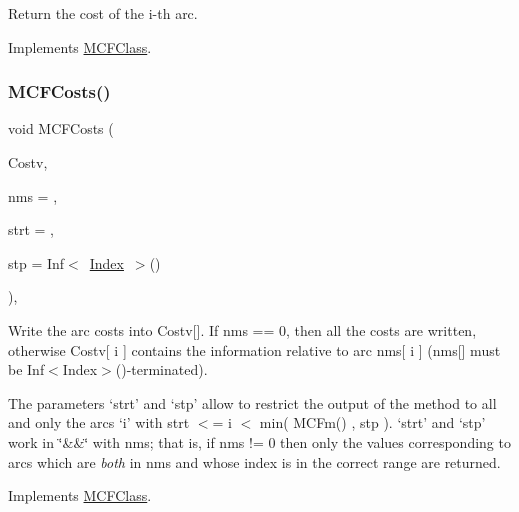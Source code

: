 Return the cost of the i-\/th arc. 

Implements \mbox{\hyperlink{class_m_c_f_class_ac666df7c1e7ed07c0f7574ec307c9e82}{M\+C\+F\+Class}}.

\mbox{\label{class_s_p_tree_a2fed5c60a9bf5b3988eed33d46d0c6de}} 
\subsubsection{\texorpdfstring{M\+C\+F\+Costs()}{MCFCosts()}}
{\footnotesize\ttfamily void M\+C\+F\+Costs (\begin{DoxyParamCaption}\item[{\mbox{\hyperlink{class_m_c_f_class_a62409402be4e4b301e1a568f99f877be}{C\+Row}}}]{Costv,  }\item[{\mbox{\hyperlink{class_m_c_f_class_a81575b2d4e4d5636b17170432150ae69}{c\+Index\+\_\+\+Set}}}]{nms = {},  }\item[{\mbox{\hyperlink{class_m_c_f_class_a76aaabb20535c51a2752b93f6c38fe54}{c\+Index}}}]{strt = {},  }\item[{\mbox{\hyperlink{class_m_c_f_class_ad53d6229d7ec28555a9c9c2fd9abf773}{Index}}}]{stp = {\ttfamily Inf$<$~\mbox{\hyperlink{class_m_c_f_class_ad53d6229d7ec28555a9c9c2fd9abf773}{Index}}~$>$()} }\end{DoxyParamCaption})\hspace{0.3cm}{\ttfamily [override]}, {\ttfamily [virtual]}}

Write the arc costs into Costv\mbox{[}\mbox{]}. If nms == 0, then all the costs are written, otherwise Costv\mbox{[} i \mbox{]} contains the information relative to arc nms\mbox{[} i \mbox{]} (nms\mbox{[}\mbox{]} must be Inf$<$\+Index$>$()-\/terminated).

The parameters `strt' and `stp' allow to restrict the output of the method to all and only the arcs `i' with strt $<$= i $<$ min( M\+C\+Fm() , stp ). `strt' and `stp' work in \char`\"{}\&\&\char`\"{} with nms; that is, if nms != 0 then only the values corresponding to arcs which are {\itshape both} in nms and whose index is in the correct range are returned. 

Implements \mbox{\hyperlink{class_m_c_f_class_ab6dbac4cde9477589de653081986abb4}{M\+C\+F\+Class}}.

\mbox{\label{class_s_p_tree_a160bbf78d4101054d9390b7e1a838eea}} 
